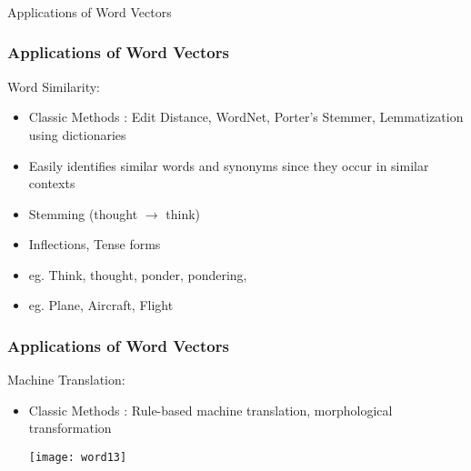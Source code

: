 \begin{frame}[fragile]\frametitle{}

\begin{center}
{\Large Applications of Word Vectors}
\end{center}
\end{frame}




\begin{frame}[fragile]\frametitle{Applications of Word Vectors}
Word Similarity:

\begin{itemize}
\item Classic Methods :  Edit Distance, WordNet, Porter's Stemmer, Lemmatization using dictionaries
\item Easily identifies similar words and synonyms since they occur in similar contexts
\item Stemming (thought $\rightarrow$ think) 
\item Inflections, Tense forms
\item eg. Think, thought, ponder, pondering,
\item eg. Plane, Aircraft, Flight
\end{itemize}
\end{frame}


\begin{frame}[fragile]\frametitle{Applications of Word Vectors}
Machine Translation:

\begin{itemize}
\item Classic Methods :  Rule-based machine translation, morphological transformation
\begin{center}
\texttt{[image: word13]}
\end{center}
\end{itemize}
\end{frame}

